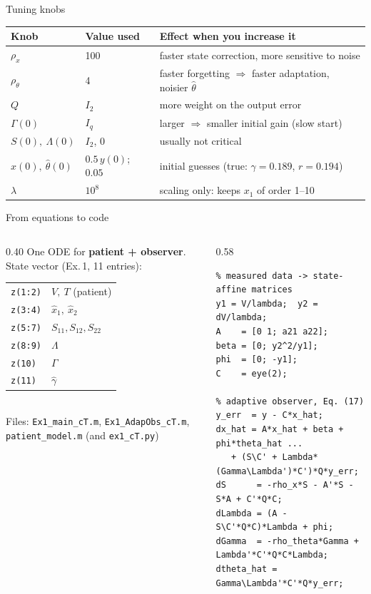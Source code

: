 \documentclass[aspectratio=169,11pt]{beamer}
\newcommand{\mnote}[1]{{\small\color{muted}#1}}
\begin{document}
\begin{frame}{Tuning knobs}
\renewcommand{\arraystretch}{1.3}
\begin{tabular}{@{}lll@{}}
\toprule
Knob & Value used & Effect when you increase it\\
\midrule
$\rho_x$ & 100 & faster state correction, more sensitive to noise\\
$\rho_\theta$ & 4 & faster forgetting $\Rightarrow$ faster adaptation, noisier $\hat\theta$\\
$Q$ & $I_2$ & more weight on the output error\\
$\Gamma(0)$ & $I_q$ & larger $\Rightarrow$ smaller initial gain (slow start)\\
$S(0),\ \Lambda(0)$ & $I_2$, $0$ & usually not critical\\
$\hat x(0),\ \hat\theta(0)$ & $0.5\,y(0)$; $0.05$ & initial guesses (true: $\gamma=0.189$, $r=0.194$)\\
$\lambda$ & $10^8$ & scaling only: keeps $x_1$ of order 1--10\\
\bottomrule
\end{tabular}
\end{frame}

\begin{frame}[fragile]{From equations to code}
\begin{columns}[T]
\begin{column}{0.40\textwidth}
\small
One ODE for \textbf{patient + observer}. State vector (Ex.\,1, 11 entries):
\begin{tabular}{@{}ll@{}}
\texttt{z(1:2)} & $V,\ T$ \mnote{(patient)}\\
\texttt{z(3:4)} & $\hat x_1,\ \hat x_2$\\
\texttt{z(5:7)} & $S_{11},S_{12},S_{22}$\\
\texttt{z(8:9)} & $\Lambda$\\
\texttt{z(10)} & $\Gamma$\\
\texttt{z(11)} & $\hat\gamma$\\
\end{tabular}\\[6pt]
\mnote{Files: \texttt{Ex1\_main\_cT.m}, \texttt{Ex1\_AdapObs\_cT.m}, \texttt{patient\_model.m} \;(and \texttt{ex1\_cT.py})}
\end{column}
\begin{column}{0.58\textwidth}
\begin{lstlisting}
% measured data -> state-affine matrices
y1 = V/lambda;  y2 = dV/lambda;
A    = [0 1; a21 a22];
beta = [0; y2^2/y1];
phi  = [0; -y1];
C    = eye(2);

% adaptive observer, Eq. (17)
y_err  = y - C*x_hat;
dx_hat = A*x_hat + beta + phi*theta_hat ...
   + (S\C' + Lambda*(Gamma\Lambda')*C')*Q*y_err;
dS      = -rho_x*S - A'*S - S*A + C'*Q*C;
dLambda = (A - S\C'*Q*C)*Lambda + phi;
dGamma  = -rho_theta*Gamma + Lambda'*C'*Q*C*Lambda;
dtheta_hat = Gamma\Lambda'*C'*Q*y_err;
\end{lstlisting}
\end{column}
\end{columns}
\end{frame}
\end{document}

